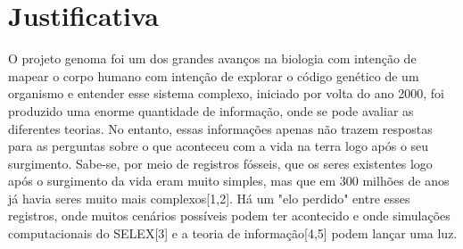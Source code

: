 \section{Justificativa}

O projeto genoma foi um dos grandes avanços na biologia com intenção de mapear o
corpo humano com intenção de explorar o código genético de um organismo e entender
esse sistema complexo, iniciado por volta do ano 2000, foi produzido uma enorme
quantidade de informação, onde se pode avaliar as diferentes teorias. No entanto, essas
informações apenas não trazem respostas para as perguntas sobre o que aconteceu com a
vida na terra logo após o seu surgimento. Sabe-se, por meio de registros fósseis, que os
seres existentes logo após o surgimento da vida eram muito simples, mas que em 300
milhões de anos já havia seres muito mais complexos[1,2]\citep{1,2}. Há um "elo perdido" entre
esses registros, onde muitos cenários possíveis podem ter acontecido e onde simulações
computacionais do SELEX[3]\citep{3} e a teoria de informação[4,5]\citep{4,5} podem lançar uma luz.